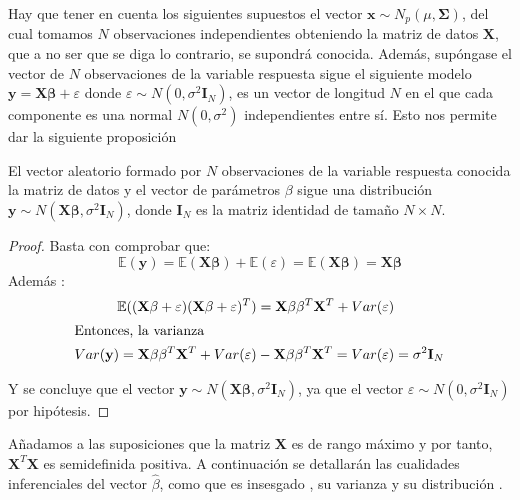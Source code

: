 \noindent Hay que tener en cuenta los siguientes supuestos el vector $\mathbf{x}\sim N_p(\mu, \mathbf{\Sigma})$, del cual tomamos $N$ observaciones independientes obteniendo la matriz de datos $\mathbf{X}$, que a no ser que se diga lo contrario, se supondrá conocida. Además, supóngase el vector de $N$ observaciones de la variable respuesta sigue el siguiente modelo $\mathbf{y}= \mathbf{X \beta}+\varepsilon$ donde $\varepsilon \sim N(0,\sigma^2\mathbf{I}_N)$, es un vector de longitud $N$ en el que cada componente es una normal $N(0,\sigma^2)$  independientes entre sí. Esto nos permite dar la siguiente proposición \cite{Cuadras 2014}
\begin{propo}
El vector aleatorio formado por $N$ observaciones de la variable respuesta conocida la matriz de datos y el vector de parámetros $\beta$ sigue una distribución
$\mathbf{y}\sim N(\mathbf{X\beta}, \sigma^2\mathbf{I}_N)$, donde $\mathbf{I}_N$ es la matriz identidad de tamaño $N \times N$.  
\begin{proof}
Basta con comprobar que:
\begin{equation}
\mathbb{E}(\mathbf{y})=\mathbb{E}(\mathbf{X\beta})+\mathbb{E}(\varepsilon)=\mathbb{E}(\mathbf{X\beta})=\mathbf{X\beta}
\end{equation}
Además :
\begin{align}
\mathbb{E}((\mathbf{X\beta}+\varepsilon)(\mathbf{X\beta}+\varepsilon)^T)&=\mathbf{X\beta}\mathbf{\beta}^T \mathbf{X}^T+ Var(\varepsilon
)\\
\intertext{Entonces, la varianza}
Var(\mathbf{y})=\mathbf{X\beta}\mathbf{\beta}^T \mathbf{X}^T+ Var(\varepsilon
)&-\mathbf{X\beta}\mathbf{\beta}^T \mathbf{X}^T=Var(\varepsilon)=\sigma^2\mathbf{I}_N
\end{align}

\noindent Y se concluye que el vector $\mathbf{y}\sim N(\mathbf{X\beta}, \sigma^2\mathbf{I}_N)$, ya que el vector $\varepsilon\sim N(0,\sigma^2 \mathbf{I}_N)$ por hipótesis. 
\end{proof}
\end{propo}

\noindent Añadamos a las suposiciones  que la matriz $\mathbf{X}$ es de rango máximo y por tanto, $\mathbf{X}^T\mathbf{X}$ es semidefinida positiva.
A continuación se detallarán las cualidades inferenciales del vector $\hat{\beta}$, como que es insesgado \cite{Greene 2008}, su varianza \cite{Greene 2008,Hastie 2001,Johnson 2007} y su distribución \cite{Hastie 2001}. 

